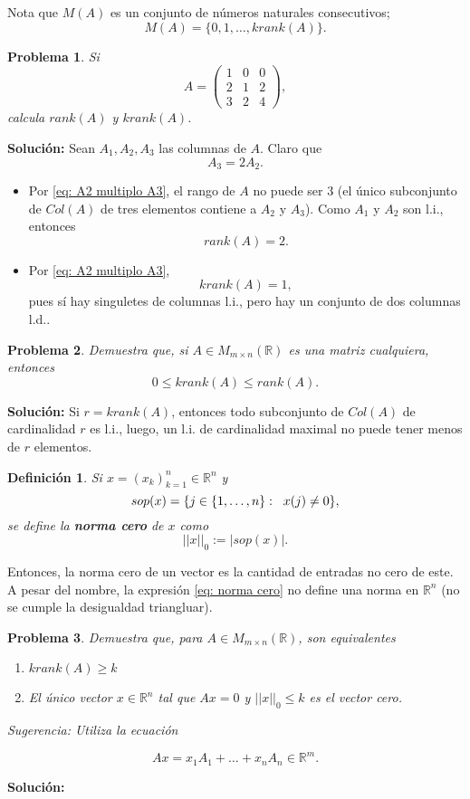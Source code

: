 \documentclass[10pt]{extreport}
\newcommand*{\IR}{\mathbb{R}}
\newtheorem{defi}{Definición}
\newtheorem{prob}{Problema}
\begin{document}
Nota que $M(A)$ es un conjunto de números naturales consecutivos;
\[
M(A) = \{ 0, 1, \ldots, krank(A) \}.
\]
\begin{prob}
Si 
\[
A = \begin{pmatrix}
	1 & 0 & 0 \\
	2 & 1 & 2 \\
	3 & 2 & 4
\end{pmatrix},
\]
calcula $rank(A)$ y $krank(A)$.	
\end{prob}
\textbf{Solución:}
Sean $A_{1}, A_{2}, A_{3}$ las columnas de $A$.
Claro que 
\begin{equation}
		\label{eq: A2 multiplo A3}
		A_{3} = 2 A_{2}.
\end{equation}
\begin{itemize}
	\item Por \eqref{eq: A2 multiplo A3}, el rango de $A$ no puede ser $3$
	(el único subconjunto de $Col(A)$ de tres elementos contiene a $A_{2}$
	y $A_{3}$). Como $A_{1}$ y $A_{2}$ son l.i., entonces 
	\[
	rank(A) = 2.
	\]
	\item Por \eqref{eq: A2 multiplo A3}, 
	\[
	krank(A) = 1,
	\]
	pues
	sí hay singuletes 
	de columnas l.i., pero hay un conjunto de dos columnas l.d..
\end{itemize}

\begin{prob}
Demuestra que, si $A \in M_{m \times n}(\IR)$ es una
matriz cualquiera, entonces
\[
0 \leq krank(A) \leq rank(A).
\]	
\end{prob}
\textbf{Solución:} Si $r = krank(A)$, entonces todo subconjunto de $Col(A)$
de cardinalidad $r$ es l.i., luego, un l.i. de cardinalidad maximal no puede tener 
menos de $r$ elementos.
\begin{defi}
	Si $x = (x_{k})_{k=1}^{n} \in \IR^{n}$ y 
	\[
	sop(x) = \{ j \in \{ 1, \ldots , n \} : \hspace{0.2cm} x(j) \neq 0 \},
	\]
	se define la \textbf{norma cero} de $x$ como
	\begin{equation}
		\label{eq: norma cero}
	||x||_{0} := | sop (x) |.
	\end{equation}
\end{defi}
Entonces, la norma cero de un vector es la cantidad de entradas no cero de este.
A pesar del nombre, la expresión \eqref{eq: norma cero} no define una norma
en $\IR^{n}$ (no se cumple la desigualdad triangluar). 
\begin{prob}
	\label{prob: 3 de Kruskal}
Demuestra que, para $A \in M_{m \times n}(\IR)$, son equivalentes
\begin{enumerate}
	\item $krank(A) \geq k$
	\item El único vector $x \in \IR^{n}$ tal que $Ax = 0$ y $||x||_{0} \leq k$ es
	el vector cero. 
\end{enumerate}
Sugerencia: Utiliza la ecuación

\begin{equation}
	\label{eq: Ax comb lineal de columnas}
	Ax = x_{1} A_{1} + \ldots + x_{n} A_{n} \in \IR^{m}.
\end{equation}

	
\end{prob}
\textbf{Solución:} 
	
\end{document}
